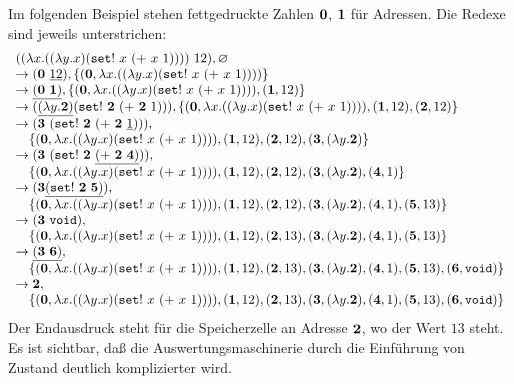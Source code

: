 Im folgenden Beispiel stehen fettgedruckte Zahlen ${\bf
0}$, ${\bf 1}$ für Adressen. Die Redexe sind jeweils
unterstrichen:
%
{\small
\begin{displaymath}
  \begin{array}{l}
    ((\lambda x.((\lambda y.x) (\mathtt{set!}~x~(+~x~1))))~12), \varnothing
    \\
    \rightarrow({\bf 0}~\underline{12}), \{ ({\bf 0}, \lambda x.((\lambda
    y.x) (\mathtt{set!}~x~(+~x~1)))) \}
    \\
    \rightarrow\underline{({\bf 0}~{\bf 1})}, \{ ({\bf 0}, \lambda x.((\lambda
    y.x) (\mathtt{set!}~x~(+~x~1)))), ({\bf 1}, 12) \}
    \\
    \rightarrow 
    (\underline{(\lambda y.{\bf 2})} (\mathtt{set!}~{\bf
    2}~(+~{\bf 2}~1))),
    \{ ({\bf 0}, \lambda x.((\lambda
    y.x) (\mathtt{set!}~x~(+~x~1)))), ({\bf 1}, 12), ({\bf
    2}, 12)\}\\
    \rightarrow 
    ({\bf 3}~(\mathtt{set!}~{\bf
    2}~(+~{\bf 2}~\underline{1}))),
    \\
    \quad
    \{ ({\bf 0}, \lambda x.((\lambda
    y.x) (\mathtt{set!}~x~(+~x~1)))), ({\bf 1}, 12), ({\bf
    2}, 12), ({\bf 3}, (\lambda y.{\bf 2}) \}
    \\
    \rightarrow 
    ({\bf 3}~(\mathtt{set!}~{\bf
    2}~\underline{(+~{\bf 2}~{\bf 4})})),
    \\
    \quad
    \{ ({\bf 0}, \lambda x.((\lambda
    y.x) (\mathtt{set!}~x~(+~x~1)))), ({\bf 1}, 12), ({\bf
    2}, 12), ({\bf 3}, (\lambda y.{\bf 2}),
    ({\bf 4}, 1) \}\\
    \rightarrow 
    ({\bf 3} \underline{(\mathtt{set!}~{\bf
      2}~{\bf 5})}),
    \\
    \quad
    \{ ({\bf 0}, \lambda x.((\lambda
    y.x) (\mathtt{set!}~x~(+~x~1)))), ({\bf 1}, 12), ({\bf
    2}, 12), ({\bf 3}, (\lambda y.{\bf 2}),
    ({\bf 4}, 1), ({\bf 5}, 13) \}
    \\
    \rightarrow 
    ({\bf 3}~\mathtt{void}),
    \\
    \quad
    \{ ({\bf 0}, \lambda x.((\lambda
    y.x) (\mathtt{set!}~x~(+~x~1)))), ({\bf 1}, 12), ({\bf
    2}, 13), ({\bf 3}, (\lambda y.{\bf 2}),
    ({\bf 4}, 1), ({\bf 5}, 13) \}
    \\
    \rightarrow 
    \underline{({\bf 3}~{\bf 6})},
    \\
    \quad
    \{ ({\bf 0}, \lambda x.((\lambda
    y.x) (\mathtt{set!}~x~(+~x~1)))), ({\bf 1}, 12), ({\bf
    2}, 13), ({\bf 3}, (\lambda y.{\bf 2}),
    ({\bf 4}, 1), ({\bf 5}, 13), ({\bf 6}, \mathtt{void}) \}
    \\
    \rightarrow 
    {\bf 2},
    \\
    \quad    \{ ({\bf 0}, \lambda x.((\lambda
    y.x) (\mathtt{set!}~x~(+~x~1)))), ({\bf 1}, 12), ({\bf
    2}, 13), ({\bf 3}, (\lambda y.{\bf 2}),
    ({\bf 4}, 1), ({\bf 5}, 13), ({\bf 6}, \mathtt{void}) \}
  \end{array}
\end{displaymath}
}
%
Der Endausdruck steht für die Speicherzelle an Adresse ${\bf
2}$, wo der Wert $13$ steht.  Es ist sichtbar, daß die
Auswertungsmaschinerie durch die Einführung von Zustand deutlich
komplizierter wird.

